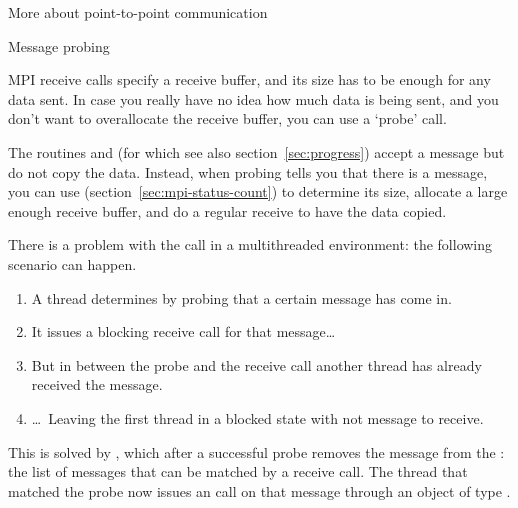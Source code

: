 




 {More about point-to-point communication}

 {Message probing}
\label{sec:mpi-probe}

MPI receive calls specify a receive buffer, and its size has to be
enough for any data sent. In case you really have no idea how much data
is being sent, and you don't want to overallocate the receive buffer,
you can use a `probe' call.

The routines  and 
(for which see also section~\ref{sec:progress})
accept a message but do not copy the data.
Instead, when probing tells you that there is a
message, you can use 
(section~\ref{sec:mpi-status-count})
to determine its size,
allocate a large enough receive buffer, and do a regular receive to
have the data copied.


There is a problem with the  call in a
multithreaded environment: the following scenario can happen.
\begin{enumerate}
\item A thread determines by probing that a certain message has come
  in.
\item It issues a blocking receive call for that message\dots
\item But in between the probe and the receive call another thread
  has already received the message.
\item \dots~Leaving the first thread in a blocked state with not
  message to receive.
\end{enumerate}
This is solved by , which after a successful
probe removes the message from the : the
list of messages that can be matched by a receive call. The thread
that matched the probe now issues an  call on
that message through an object of type .


